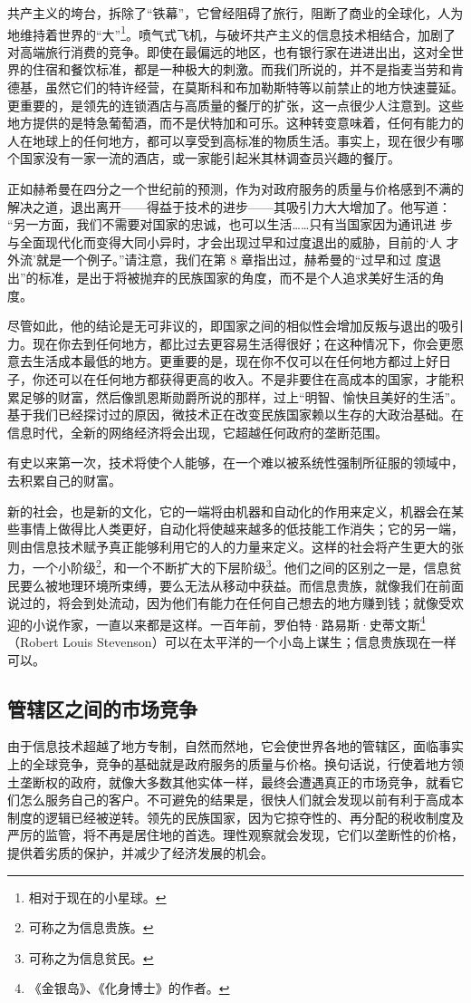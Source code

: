 共产主义的垮台，拆除了“铁幕”，它曾经阻碍了旅行，阻断了商业的全球化，人为地维持着世界的“大”\footnote{相对于现在的小星球。}。喷气式飞机，与破坏共产主义的信息技术相结合，加剧了对高端旅行消费的竞争。即使在最偏远的地区，也有银行家在进进出出，这对全世界的住宿和餐饮标准，都是一种极大的刺激。而我们所说的，并不是指麦当劳和肯德基，虽然它们的特许经营，在莫斯科和布加勒斯特等以前禁止的地方快速蔓延。更重要的，是领先的连锁酒店与高质量的餐厅的扩张，这一点很少人注意到。这些地方提供的是特急葡萄酒，而不是伏特加和可乐。这种转变意味着，任何有能力的人在地球上的任何地方，都可以享受到高标准的物质生活。事实上，现在很少有哪个国家没有一家一流的酒店，或一家能引起米其林调查员兴趣的餐厅。

正如赫希曼在四分之一个世纪前的预测，作为对政府服务的质量与价格感到不满的解决之道，退出离开——得益于技术的进步——其吸引力大大增加了。他写道： “另一方面，我们不需要对国家的忠诚，也可以生活……只有当国家因为通讯进 步与全面现代化而变得大同小异时，才会出现过早和过度退出的威胁，目前的‘人 才外流’就是一个例子。”请注意，我们在第 8 章指出过，赫希曼的“过早和过 度退出”的标准，是出于将被抛弃的民族国家的角度，而不是个人追求美好生活的角度。

尽管如此，他的结论是无可非议的，即国家之间的相似性会增加反叛与退出的吸引力。现在你去到任何地方，都比过去更容易生活得很好；在这种情况下，你会更愿意去生活成本最低的地方。更重要的是，现在你不仅可以在任何地方都过上好日子，你还可以在任何地方都获得更高的收入。不是非要住在高成本的国家，才能积累足够的财富，然后像凯恩斯勋爵所说的那样，过上“明智、愉快且美好的生活”。基于我们已经探讨过的原因，微技术正在改变民族国家赖以生存的大政治基础。在信息时代，全新的网络经济将会出现，它超越任何政府的垄断范围。

有史以来第一次，技术将使个人能够，在一个难以被系统性强制所征服的领域中，去积累自己的财富。

新的社会，也是新的文化，它的一端将由机器和自动化的作用来定义，机器会在某些事情上做得比人类更好，自动化将使越来越多的低技能工作消失；它的另一端，则由信息技术赋予真正能够利用它的人的力量来定义。这样的社会将产生更大的张力，一个小阶级\footnote{可称之为信息贵族。}，和一个不断扩大的下层阶级\footnote{可称之为信息贫民。}。他们之间的区别之一是，信息贫民要么被地理环境所束缚，要么无法从移动中获益。而信息贵族，就像我们在前面说过的，将会到处流动，因为他们有能力在任何自己想去的地方赚到钱；就像受欢迎的小说作家，一直以来都是这样。一百年前，罗伯特·路易斯·史蒂文斯\footnote{《金银岛》、《化身博士》的作者。}（Robert Louis Stevenson）可以在太平洋的一个小岛上谋生；信息贵族现在一样可以。

\subsection{管辖区之间的市场竞争}
由于信息技术超越了地方专制，自然而然地，它会使世界各地的管辖区，面临事实上的全球竞争，竞争的基础就是政府服务的质量与价格。换句话说，行使着地方领土垄断权的政府，就像大多数其他实体一样，最终会遭遇真正的市场竞争，就看它们怎么服务自己的客户。不可避免的结果是，很快人们就会发现以前有利于高成本制度的逻辑已经被逆转。领先的民族国家，因为它掠夺性的、再分配的税收制度及严厉的监管，将不再是居住地的首选。理性观察就会发现，它们以垄断性的价格，提供着劣质的保护，并减少了经济发展的机会。

